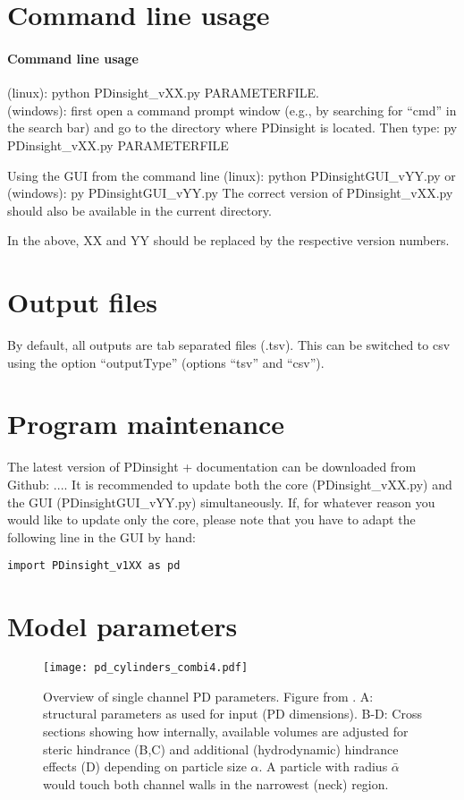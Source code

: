 \documentclass[a4paper,12pt]{article}
\newcommand{\SEL}{\bar{\alpha}}
\begin{document}
\section{Command line usage}
\paragraph{Command line usage} (linux): python PDinsight\_vXX.py PARAMETERFILE. \\
(windows): first open a command prompt window (e.g., by searching for ``cmd'' in the search bar) and go to the directory where PDinsight is located. Then type: py PDinsight\_vXX.py PARAMETERFILE

Using the GUI from the command line (linux): python PDinsightGUI\_vYY.py or (windows): py PDinsightGUI\_vYY.py 
The correct version of PDinsight\_vXX.py should also be available in the current directory.

In the above, XX and YY should be replaced by the respective version numbers. 

\section{Output files}
By default, all outputs are tab separated files (.tsv). This can be switched to csv using the option ``outputType'' (options ``tsv'' and ``csv'').

\section{Program maintenance}
The latest version of PDinsight + documentation can be downloaded from Github: ....
It is recommended to update both the core (PDinsight\_vXX.py) and the GUI (PDinsightGUI\_vYY.py) simultaneously. If, for whatever reason you would like to update only the core, please note that you have to adapt the following line in the GUI by hand:

\texttt{import PDinsight\_v1XX as pd}

\section{Model parameters}

\begin{figure}
\texttt{[image: pd\_cylinders\_combi4.pdf]}
\caption{Overview of single channel PD parameters. Figure from \citet{Deinum.e19}. A: structural parameters as used for input (PD dimensions). B-D: Cross sections showing how internally, available volumes are adjusted for steric hindrance (B,C) and additional (hydrodynamic) hindrance effects (D) depending on particle size $\alpha$. A particle with radius $\SEL$ would touch both channel walls in the narrowest (neck) region.}
\label{fig:layout}
\end{figure}
\end{document}
